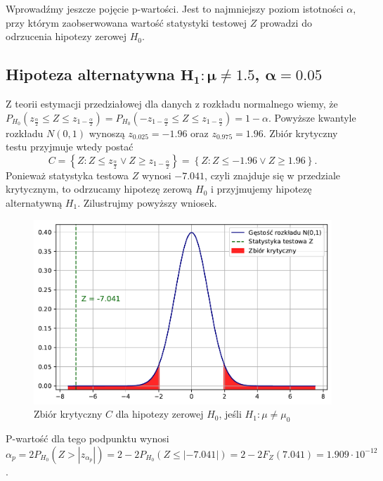 \documentclass[12pt]{mwart}
\begin{document}
	
	\noindent Wprowadźmy jeszcze pojęcie p-wartości. Jest to najmniejszy poziom istotności $\alpha$, przy którym zaobserwowana wartość statystyki testowej $Z$ prowadzi do odrzucenia hipotezy zerowej $H_0$.

	
	\subsection{Hipoteza alternatywna $\bm{H_1 \colon \mu \neq 1.5}$, $\bm{\alpha=0.05}$}
	\noindent Z teorii estymacji przedziałowej dla danych z rozkładu normalnego wiemy, że $P_{H_0}(z_{\frac{\alpha}{2}} \leq Z \leq z_{1-\frac{\alpha}{2}})= P_{H_0}(-z_{1-\frac{\alpha}{2}} \leq Z \leq z_{1-\frac{\alpha}{2}}) = 1 - \alpha$. Powyższe kwantyle rozkładu $N(0,1)$ wynoszą $z_{0.025}=-1.96$ oraz $z_{0.975}=1.96$. Zbiór krytyczny testu przyjmuje wtedy postać
$$C = \left\lbrace Z: Z\leq z_{\frac{\alpha}{2}} \vee Z\geq z_{1-\frac{\alpha}{2}} \right\rbrace = \left\lbrace Z: Z\leq -1.96 \vee Z\geq 1.96 \right\rbrace.$$ 
Ponieważ statystyka testowa $Z$ wynosi $-7.041$, czyli znajduje się w przedziale krytycznym, to odrzucamy hipotezę zerową $H_0$ i przyjmujemy hipotezę alternatywną $H_1$. Zilustrujmy powyższy wniosek.

	\begin{figure}[H]
	\begin{center}
		\includegraphics[scale=0.6]{krytyczny1.pdf}
		\caption{Zbiór krytyczny $C$ dla hipotezy zerowej $H_0$, jeśli $H_1 \colon \mu \neq \mu_0$}
	\end{center}
	\end{figure}
	
\noindent P-wartość dla tego podpunktu wynosi $\alpha_p = 2P_{H_0}(Z > |z_{\alpha_p}|) = 2 - 2P_{H_0}(Z \leq |-7.041|) = 2- 2F_Z(7.041) = 1.909 \cdot 10^{-12}$.
	
\end{document}
